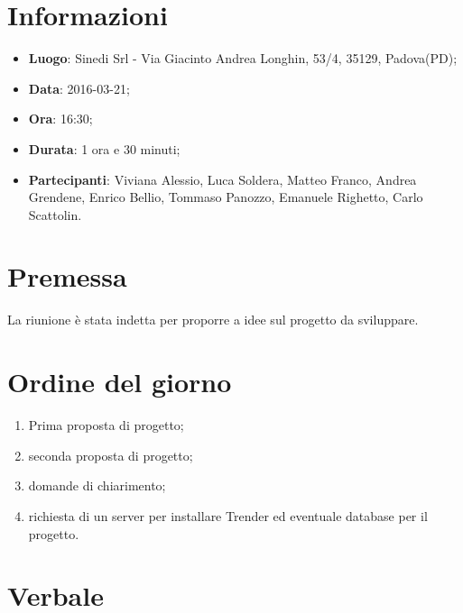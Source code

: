 \documentclass[a4paper,titlepage]{article}
\begin{document}
\maketitle

\newpage
\tableofcontents

\newpage
\section{Informazioni}
\label{sec:Informazioni}

\begin{itemize}
  \item \textbf{Luogo}: Sinedi Srl - Via Giacinto Andrea Longhin, 53/4, 35129, Padova(PD);
  \item \textbf{Data}: 2016-03-21;
  \item \textbf{Ora}: 16:30;
  \item \textbf{Durata}: 1 ora e 30 minuti;
  \item \textbf{Partecipanti}: Viviana Alessio, Luca Soldera, Matteo Franco, Andrea Grendene, Enrico Bellio, Tommaso Panozzo, Emanuele Righetto, Carlo Scattolin.
\end{itemize}

\newpage
\section{Premessa}

La riunione è stata indetta per proporre a \PROPONENTE{} idee sul progetto da sviluppare.

\section{Ordine del giorno}
\label{sec:OrdineDelGiorno}

\begin{enumerate}
  \item Prima proposta di progetto;
  \item seconda proposta di progetto;
  \item domande di chiarimento;
  \item richiesta di un server per installare Trender ed eventuale database per il progetto.
\end{enumerate}

\newpage
\section{Verbale}
\label{sec:Verbale}
\end{document}
